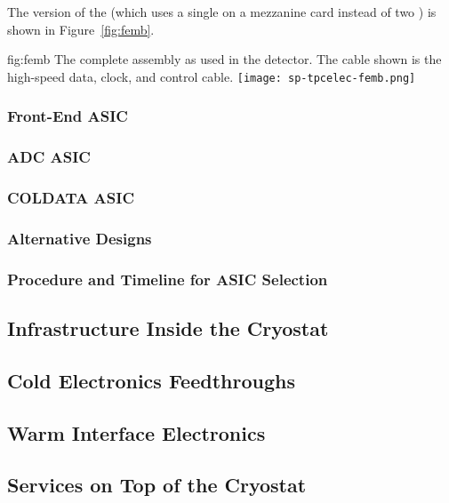 The  version of the  (which uses a single  on a mezzanine card instead of two  ) is shown in Figure~\ref{fig:femb}.

\begin{dunefigure}
{fig:femb}
{The complete  assembly as used in the  detector. The cable shown is the high-speed data, clock, and control cable.}
\texttt{[image: sp-tpcelec-femb.png]}
\end{dunefigure}

\subsubsection{Front-End ASIC}
\label{sec:fdsp-tpcelec-design-femb-fe}

\subsubsection{ADC ASIC}
\label{sec:fdsp-tpcelec-design-femb-adc}

\subsubsection{COLDATA ASIC}
\label{sec:fdsp-tpcelec-design-femb-coldata}

\subsubsection{Alternative Designs}
\label{sec:fdsp-tpcelec-design-femb-alt}

\subsubsection{Procedure and Timeline for ASIC Selection}
\label{sec:fdsp-tpcelec-design-femb-selection}

\subsection{Infrastructure Inside the Cryostat}
\label{sec:fdsp-tpcelec-design-infrastructure}

\subsection{Cold Electronics Feedthroughs}
\label{sec:fdsp-tpcelec-design-ft}

\subsection{Warm Interface Electronics}
\label{sec:fdsp-tpcelec-design-warm}

\subsection{Services on Top of the Cryostat}
\label{sec:fdsp-tpcelec-design-services}
